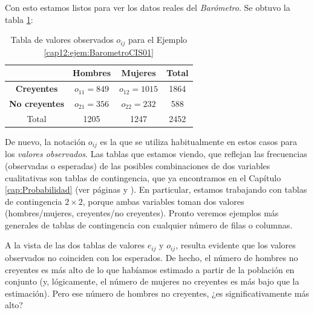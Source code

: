 \begin{ejemplo}
Con esto estamos listos para ver los datos reales del {\em Barómetro}. Se obtuvo la tabla
\ref{cap12:tabla:valoresObservadosEjemploBarometroCis}:
\begin{table}[ht]
    \begin{center}
    \begin{tabular}{|c|c|c|c|}
      \hline
       &{\bf Hombres }&{\bf Mujeres }& Total \\
       \hline
      {\bf Creyentes }& $o_{11}=849$ & $o_{12}=1015$ & 1864 \\
      \hline
      {\bf No creyentes }& $o_{21}=356$ & $o_{22}=232$ & 588 \\
      \hline
      Total & 1205 & 1247 & 2452 \\
      \hline
    \end{tabular}
    \end{center}
\caption{Tabla de valores observados  $o_{ij}$ para el Ejemplo \ref{cap12:ejem:BarometroCIS01}}
\label{cap12:tabla:valoresObservadosEjemploBarometroCis}
\end{table}



De nuevo, la notación $o_{ij}$ es la que se utiliza habitualmente en estos casos para los {\em
valores observados}. Las tablas que estamos viendo, que reflejan las frecuencias (observadas o esperadas) de las posibles combinaciones de dos variables cualitativas son {\sf tablas de  contingencia}, que ya encontramos en el Capítulo \ref{cap:Probabilidad} (ver páginas \pageref{cap03:subsubsec:TablasContingenciaProbabilidadCondicionada} y \pageref{cap03:subsec:PrevalenciaSensibilidad}). En
particular, estamos trabajando con tablas de contingencia $2\times 2$, porque ambas variables toman
dos valores (hombres/mujeres, creyentes/no creyentes). Pronto veremos ejemplos más generales de
tablas de contingencia con cualquier número de filas o columnas.


A la vista de las dos tablas de valores $e_{ij}$ y $o_{ij}$, resulta evidente que los valores observados no coinciden con los esperados. De hecho, el número de hombres no creyentes es más alto de lo que habíamos estimado a partir de la población en conjunto (y, lógicamente, el número de mujeres no creyentes es más bajo que la estimación). Pero ese número de hombres no creyentes, ¿es {\sf significativamente} más alto?


\end{ejemplo}
